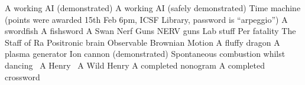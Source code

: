 \begin{multicols}{2}
\begin{small}
\begin{tabbing}
           {A working AI (demonstrated)}
          {A working AI (safely demonstrated)}
        {Time machine (points were awarded 15th Feb 6pm,
        ICSF Library, password is ``arpeggio'')}
          {A swordfish}
          {A fishsword}
          {A Swan}
           {Nerf Guns}
           {NERV guns}
          {Lab stuff}
         {Per fatality}
          {The Staff of Ra}
           {Positronic brain}
           {Observable Brownian Motion}
           {A fluffy dragon}
           {A plasma generator}
           {Ion cannon (demonstrated)}
         {Spontaneous combustion whilst dancing~\E}
           {A Henry~\E}
          {A Wild Henry}
          {A completed nonogram}
          {A completed crossword}
    \end{tabbing}
  \end{small}
\end{multicols}

\vfill

\begin{center}
\end{center}

\vfill

